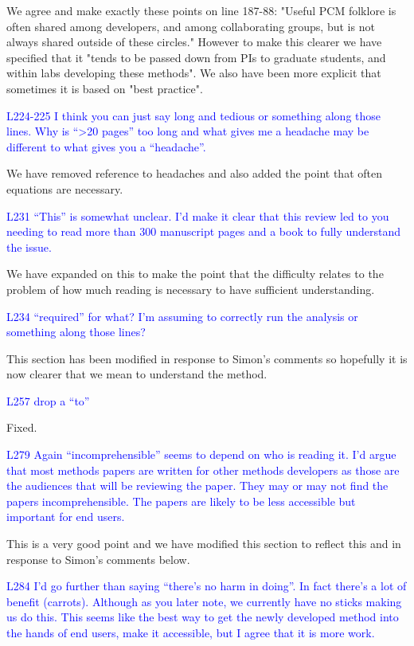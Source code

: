 \documentclass[12pt]{letter}
\begin{document}
\begin{letter}{}
We agree and make exactly these points on line 187-88: "Useful PCM folklore is often shared among developers, and among collaborating groups, but is not always shared outside of these circles." However to make this clearer we have specified that it "tends to be passed down from PIs to graduate students, and within labs developing these methods". We also have been more explicit that sometimes it is based on "best practice".

\textcolor{blue}{L224-225 I think you can just say long and tedious or something along those lines. Why is “>20 pages” too long and what gives me a headache may be different to what gives you a “headache”.}

We have removed reference to headaches and also added the point that often equations are necessary.

\textcolor{blue}{L231 “This” is somewhat unclear. I'd make it clear that this review led to you needing to read more than 300 manuscript pages and a book to fully understand the issue.}

We have expanded on this to make the point that the difficulty relates to the problem of how much reading is necessary to have sufficient understanding. 

\textcolor{blue}{L234 “required” for what? I'm assuming to correctly run the analysis or something along those lines?}

This section has been modified in response to Simon's comments so hopefully it is now clearer that we mean to understand the method.

\textcolor{blue}{L257 drop a “to”}

Fixed.

\textcolor{blue}{L279 Again “incomprehensible” seems to depend on who is reading it. I'd argue that most methods papers are written for other methods developers as those are the audiences that will be reviewing the paper. They may or may not find the papers incomprehensible. The papers are likely to be less accessible but important for end users.}

This is a very good point and we have modified this section to reflect this and in response to Simon's comments below.

\textcolor{blue}{L284 I'd go further than saying “there's no harm in doing”. In fact there's a lot of benefit (carrots). Although as you later note, we currently have no sticks making us do this. This seems like the best way to get the newly developed method into the hands of end users, make it accessible, but I agree that it is more work.}


\end{letter}
\end{document}
